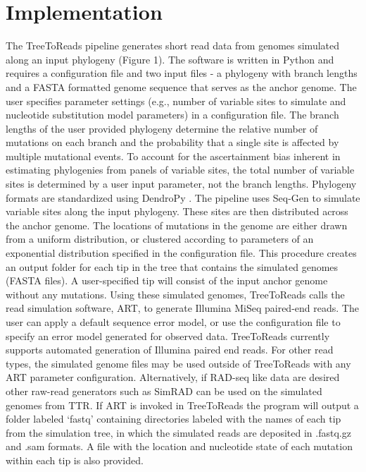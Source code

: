 \documentclass{bmcart}
\begin{document}
\section*{Implementation}
The TreeToReads pipeline generates short read data from genomes simulated along an input phylogeny (Figure 1).
The software is written in Python and requires a configuration file and two input files - a phylogeny with branch lengths and a FASTA formatted genome sequence that serves as the anchor genome.
The user specifies parameter settings (e.g., number of variable sites to simulate and nucleotide substitution model parameters) in a configuration file.
The branch lengths of the user provided phylogeny determine the relative number of mutations on each branch and the probability that a single site is affected by multiple mutational events.
To account for the ascertainment bias inherent in estimating phylogenies from panels of variable sites, the total number of variable sites is determined by a user input parameter, not the branch lengths.
Phylogeny formats are standardized using DendroPy \cite{sukumaran_dendropy:_2010}.
The pipeline uses Seq-Gen \cite{rambaut_seq-gen:_1997} to simulate variable sites along the input phylogeny.
These sites are then distributed across the anchor genome. 
The locations of mutations in the genome are either drawn from a uniform distribution, or clustered according to parameters of an exponential distribution specified in the configuration file.
This procedure creates an output folder for each tip in the tree that contains the simulated genomes (FASTA files).
A user-specified tip will consist of the input anchor genome without any mutations.
Using these simulated genomes, TreeToReads calls the read simulation software, ART, \cite{huang_art:_2012} to generate Illumina MiSeq paired-end reads.
The user can apply a default sequence error model, or use the configuration file to specify an error model generated for observed data.
TreeToReads currently supports automated generation of Illumina paired end reads.
For other read types, the simulated genome files may be used outside of TreeToReads with any ART parameter configuration.
Alternatively, if RAD-seq like data are desired other raw-read generators such as SimRAD \cite{lepais_simrad:_2014} can be used on the simulated genomes from TTR.
If ART is invoked in TreeToReads the program will output a folder labeled `fastq'
containing directories labeled with the names of each tip from the simulation tree, in which the simulated reads are deposited in .fastq.gz and .sam formats.
A file with the location and nucleotide state of each mutation within each tip is also provided. 
\end{document}
